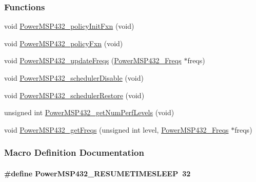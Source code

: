 \subsubsection*{Functions}
\begin{DoxyCompactItemize}
\item 
void \hyperlink{_power_m_s_p432_8h_a5bc73c79d67820d4d9d8373024110a63}{Power\+M\+S\+P432\+\_\+policy\+Init\+Fxn} (void)
\item 
void \hyperlink{_power_m_s_p432_8h_afcb5bd06bf31fb6b2dc923847e444d8c}{Power\+M\+S\+P432\+\_\+policy\+Fxn} (void)
\item 
void \hyperlink{_power_m_s_p432_8h_a5ce1a79d0e0f840e8a68e0c9572115d3}{Power\+M\+S\+P432\+\_\+update\+Freqs} (\hyperlink{struct_power_m_s_p432___freqs}{Power\+M\+S\+P432\+\_\+\+Freqs} $\ast$freqs)
\item 
void \hyperlink{_power_m_s_p432_8h_ad5490fa6d4283a31758e8404f3691279}{Power\+M\+S\+P432\+\_\+scheduler\+Disable} (void)
\item 
void \hyperlink{_power_m_s_p432_8h_a2d77e340c12363d05c2709158f652032}{Power\+M\+S\+P432\+\_\+scheduler\+Restore} (void)
\item 
unsigned int \hyperlink{_power_m_s_p432_8h_a7b595d857012e1fd65a34d12367f334d}{Power\+M\+S\+P432\+\_\+get\+Num\+Perf\+Levels} (void)
\item 
void \hyperlink{_power_m_s_p432_8h_a27bf7bbfaf9bcd13a44dd444425a91de}{Power\+M\+S\+P432\+\_\+get\+Freqs} (unsigned int level, \hyperlink{struct_power_m_s_p432___freqs}{Power\+M\+S\+P432\+\_\+\+Freqs} $\ast$freqs)
\end{DoxyCompactItemize}


\subsubsection{Macro Definition Documentation}
\paragraph[{Power\+M\+S\+P432\+\_\+\+R\+E\+S\+U\+M\+E\+T\+I\+M\+E\+S\+L\+E\+E\+P}]{\setlength{\rightskip}{0pt plus 5cm}\#define Power\+M\+S\+P432\+\_\+\+R\+E\+S\+U\+M\+E\+T\+I\+M\+E\+S\+L\+E\+E\+P~32}\label{_power_m_s_p432_8h_a67cef68228351bd66a984b521d134482}

